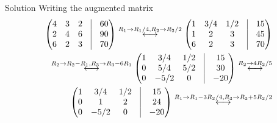 \documentclass{beamer}
\theoremstyle{remark}
\newcommand{\myvec}[1]{\ensuremath{\begin{pmatrix}#1\end{pmatrix}}}
\begin{document}
\begin{frame}{Solution}
Writing the augmented matrix
\begin{align}
    \myvec{4 & 3 & 2 & \vrule & 60 \\ 2 &  4& 6 & \vrule & 90\\ 6 & 2 & 3& \vrule & 70}
    \overset{R_1 \rightarrow R_1 /4, R_2 \rightarrow R_2/2}{\longleftrightarrow}
    \myvec{1 & 3/4 & 1/2 & \vrule & 15 \\ 1 &  2& 3 & \vrule & 45\\ 6 & 2 & 3& \vrule & 70}\\
    \overset{R_2\rightarrow R_2-R_1, R_3 \rightarrow R_3 - 6R_1}{\longleftrightarrow}
    \myvec{1 & 3/4 & 1/2 & \vrule & 15 \\ 0 &  5/4& 5/2 & \vrule & 30\\ 0 & -5/2 & 0& \vrule & -20}\overset{R_2 \rightarrow 4R_2/5}{\longleftrightarrow}\\
     \myvec{1 & 3/4 & 1/2 & \vrule & 15 \\ 0 &  1& 2 & \vrule & 24\\ 0 & -5/2 & 0& \vrule & -20} \overset{R_1 \rightarrow R_1 - 3R_2/4, R_3 \rightarrow R_3 + 5R_2/2}{\longleftrightarrow}
\end{align}
\end{frame}
\end{document}
